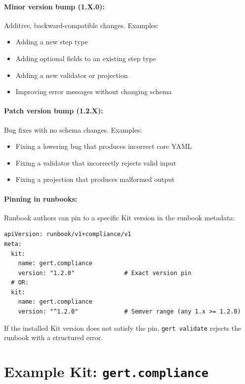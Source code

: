 \paragraph{Minor version bump (1.X.0):}
Additive, backward-compatible changes. Examples:

\begin{itemize}
  \item Adding a new step type
  \item Adding optional fields to an existing step type
  \item Adding a new validator or projection
  \item Improving error messages without changing schema
\end{itemize}

\paragraph{Patch version bump (1.2.X):}
Bug fixes with no schema changes. Examples:

\begin{itemize}
  \item Fixing a lowering bug that produces incorrect core YAML
  \item Fixing a validator that incorrectly rejects valid input
  \item Fixing a projection that produces malformed output
\end{itemize}

\paragraph{Pinning in runbooks:}

Runbook authors can pin to a specific Kit version in the runbook metadata:

\begin{verbatim}
apiVersion: runbook/v1+compliance/v1
meta:
  kit:
    name: gert.compliance
    version: "1.2.0"              # Exact version pin
  # OR:
  kit:
    name: gert.compliance
    version: "^1.2.0"             # Semver range (any 1.x >= 1.2.0)
\end{verbatim}

If the installed Kit version does not satisfy the pin, \texttt{gert validate}
rejects the runbook with a structured error.

\section{Example Kit: \texttt{gert.compliance}}
\label{sec:example-kit}

